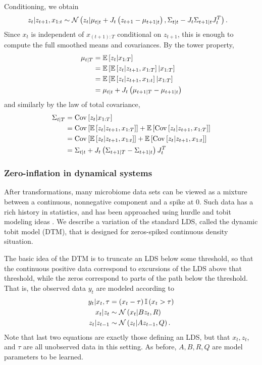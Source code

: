 \documentclass{article}
\begin{document}
Conditioning, we obtain
\begin{align*}
  z_{t} \vert z_{t + 1}, x_{1:t} &\sim \mathcal{N}\left(
  z_{t} \vert \mu_{t \vert t} + J_{t}\left(z_{t + 1} - \mu_{t + 1 \vert t}\right),
  \Sigma_{t \vert t} - J_{t} \Sigma_{t + 1 \vert t} J_{t}^{T}
  \right).
\end{align*}
Since $x_{t}$ is independent of $x_{(t + 1): T}$ conditional on $z_{t + 1}$,
this is enough to compute the full smoothed means and covariances. By the tower
property,
\begin{align*}
  \mu_{t \vert T} &= \mathbb{E}\left[{z_{t} \vert x_{1:T}}\right] \\
  &= \mathbb{E}\left[{\mathbb{E}\left[{z_{t} \vert z_{t + 1}, x_{1 : T}}\right] \vert x_{1:T}}\right] \\
  &= \mathbb{E}\left[{\mathbb{E}\left[{z_{t} \vert z_{t + 1}, x_{1:t}}\right] \vert x_{1:T}}\right] \\
  &= \mu_{t \vert t} + J_{t}\left(\mu_{t + 1 \vert T} - \mu_{t + 1 \vert t}\right)
\end{align*}
and similarly by the law of total covariance,
\begin{align*}
  \Sigma_{t\vert T} &= \mathrm{Cov}\left[{z_{t} \vert x_{1:T}}\right] \\
  &= \mathrm{Cov}\left[{\mathbb{E}\left[{z_{t} \vert z_{t + 1}, x_{1:T}}\right]}\right] + \mathbb{E}\left[{\mathrm{Cov}\left[{z_{t} \vert z_{t + 1}, x_{1:T}}\right]}\right] \\
  &= \mathrm{Cov}\left[{\mathbb{E}\left[{z_{t} \vert z_{t + 1}, x_{1:t}}\right]}\right] + \mathbb{E}\left[{\mathrm{Cov}\left[{z_{t} \vert z_{t + 1}, x_{1:t}}\right]}\right] \\
  &= \Sigma_{t \vert t} + J_{t}\left(\Sigma_{t + 1 \vert T} - \Sigma_{t + 1 \vert t}\right) J_{t}^{T}
\end{align*}

\subsubsection{Zero-inflation in dynamical systems}
\label{subsubsec:zero_inflation_dynamical}

After transformations, many microbiome data sets can be viewed as a mixture
between a continuous, nonnegative component and a spike at 0. Such data has a
rich history in statistics, and has been approached using hurdle and tobit
modeling ideas \citep{min2002modeling}. We describe a variation of the standard
LDS, called the dynamic tobit model (DTM), that is designed for zeros-spiked
continuous density situation.

The basic idea of the DTM is to truncate an LDS below some threshold, so that
the continuous positive data correspond to excursions of the LDS above that
threshold, while the zeros correspond to parts of the path below the threshold.
That is, the observed data $y_t$ are modeled according to
\begin{align*}
  y_{t} \vert x_t, \tau &= \left(x_t - \tau\right)\mathbb{I}\left({x_t > \tau}\right)  \\
  x_t \vert z_t &\sim \mathcal{N}\left(x_t \vert B z_{t}, R\right) \\
  z_t \vert z_{t - 1} &\sim \mathcal{N}\left(z_t \vert A z_{t - 1}, Q\right).
\end{align*}
Note that last two equations are exactly those defining an LDS, but that $x_t,
z_t$, and $\tau$ are all unobserved data in this setting. As before, $A, B, R,
Q$ are model parameters to be learned.
\end{document}
